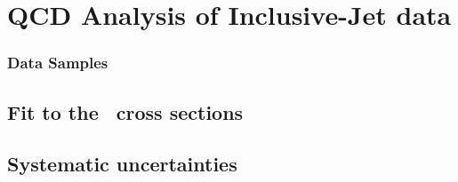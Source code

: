 \section{QCD Analysis of Inclusive-Jet data}
\label{sec:aspdffit}

\subsubsection{Data Samples}
\label{subsec:aspdffitdata}


\subsection{Fit to the \dsdetjetb~cross sections}
\label{subsec:doubledifasfit}



\subsection{Systematic uncertainties}
\label{subsec:assysunc}

